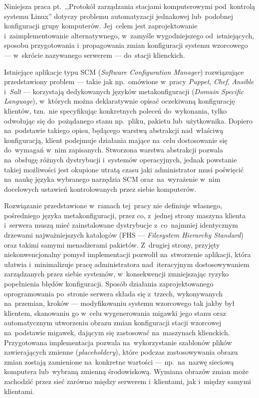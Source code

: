 \documentclass[11pt,a4paper]{article}
\begin{document}
Niniejsza praca pt.~,,Protokół zarządzania stacjami komputerowymi pod~kontrolą systemu Linux'' dotyczy problemu automatyzacji jednakowej lub~podobnej konfiguracji grupy komputerów. Jej~celem jest zaprojektowanie i~zaimplementowanie alternatywnego, w~zamyśle wygodniejszego od~istniejących, sposobu przygotowania i~propagowania zmian konfiguracji systemu wzorcowego --- w~skrócie nazywanego serwerem --- do~stacji klienckich.%

Istniejące aplikacje typu SCM (\emph{Software Configuration Manager}) rozwiązujące przedstawiony problem --- takie jak np.~omówione w~pracy \emph{Puppet}, \emph{Chef}, \emph{Ansible} i~\emph{Salt} --- korzystają dedykowanych języków metakonfiguracji (\emph{Domain Specific Language}), w~których można deklaratywnie opisać oczekiwaną konfigurację klientów, tzn.~nie specyfikując konkretnych poleceń do~wykonania, tylko odwołując się do~pożądanego stanu np.~pliku, pakietu lub~użytkownika. Dopiero na~podstawie takiego opisu, będącego warstwą abstrakcji nad~właściwą konfiguracją, klient podejmuje działania mające na~celu dostosowanie się do~wymagań w~nim zapisanych. Stworzona warstwa abstrakcji pozwala na~obsługę różnych dystrybucji i~systemów operacyjnych, jednak powstanie takiej możliwości jest okupione utratą czasu jaki administrator musi poświęcić na~naukę języka wybranego narzędzia SCM oraz~na~wyrażenie w~nim docelowych ustawień kontrolowanych przez siebie komputerów.

Rozwiązanie przedstawione w~ramach tej~pracy nie definiuje własnego, pośredniego języka metakonfiguracji, przez co, z~jednej strony maszyna klienta i~serwera muszą mieć zainstalowane dystrybucje z~co~najmniej identycznym drzewami najważniejszych katalogów (FHS --- \emph{Filesystem Hierarchy Standard}) oraz takimi samymi menadżerami pakietów. Z~drugiej strony, przyjęty niekonwencjonalny pomysł implementacji pozwolił na~stworzenie aplikacji, która ułatwia i~minimalizuje pracę administratora nad~iteracyjnym dostosowywaniem zarządzanych przez siebie systemów, w~konsekwencji zmniejszając ryzyko popełnienia błędów konfiguracji. Sposób działania zaprojektowanego oprogramowania po~stronie serwera składa się z~trzech, wykonywanych na~przemian, kroków --- modyfikowaniu systemu wzorcowego tak jakby był klientem, skanowaniu go w~celu wygenerowania migawki jego stanu oraz automatycznym utworzeniu obrazu zmian konfiguracji stacji wzorcowej na~podstawie migawek, dającym się zastosować na~maszynach klienckich. Przygotowana implementacja pozwala na~wykorzystanie szablonów plików zawierających zmienne (\emph{placeholdery}), które podczas zastosowywania obrazu zmian zostają zamienione na~konkretne wartości --- np.~na~nazwę sieciową komputera lub~wybraną zmienną środowiskową. Wymiana obrazów zmian może zachodzić przez sieć zarówno między serwerem i~klientami, jak i~między samymi klientami.
\end{document}
